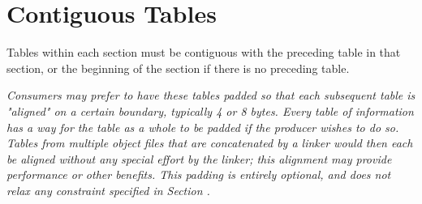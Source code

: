 \bb
\section{Contiguous Tables}
\label{datarep:contiguoustables}
Tables within each section must be contiguous with the preceding 
table in that section, or the beginning of the section if there 
is no preceding table.

\textit{Consumers may prefer to have these tables padded so that 
each subsequent table is "aligned" on a certain boundary, typically 
4 or 8 bytes. Every table of information has a way for the table as 
a whole to be padded if the producer wishes to do so. Tables from 
multiple object files that are concatenated by a linker would then 
each be aligned without any special effort by the linker; this 
alignment may provide performance or other benefits. 
This padding is entirely optional, and does not relax any constraint 
specified in Section .}
\eb

